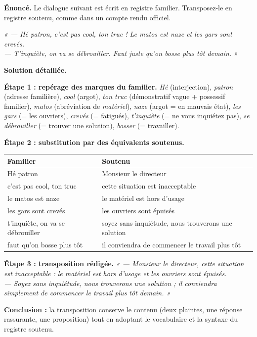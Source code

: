 \documentclass[11pt]{article}
\begin{document}
\begin{exoresolu}
\textbf{Énoncé.} Le dialogue suivant est écrit en registre familier. Transposez-le en registre soutenu, comme dans un compte rendu officiel.

\emph{« — Hé patron, c'est pas cool, ton truc ! Le matos est naze et les gars sont crevés.\\
— T'inquiète, on va se débrouiller. Faut juste qu'on bosse plus tôt demain. »}

\tcblower
\textbf{Solution détaillée.}

\textbf{Étape 1 : repérage des marques du familier.} \emph{Hé} (interjection), \emph{patron} (adresse familière), \emph{cool} (argot), \emph{ton truc} (démonstratif vague + possessif familier), \emph{matos} (abréviation de \emph{matériel}), \emph{naze} (argot = en mauvais état), \emph{les gars} (= les ouvriers), \emph{crevés} (= fatigués), \emph{t'inquiète} (= ne vous inquiétez pas), \emph{se débrouiller} (= trouver une solution), \emph{bosser} (= travailler).

\textbf{Étape 2 : substitution par des équivalents soutenus.}
\begin{center}
\begin{tabularx}{\linewidth}{|l|X|}\hline
\rowcolor{popblueL} \textbf{Familier} & \textbf{Soutenu} \\ \hline
Hé patron & Monsieur le directeur \\ \hline
c'est pas cool, ton truc & cette situation est inacceptable \\ \hline
le matos est naze & le matériel est hors d'usage \\ \hline
les gars sont crevés & les ouvriers sont épuisés \\ \hline
t'inquiète, on va se débrouiller & soyez sans inquiétude, nous trouverons une solution \\ \hline
faut qu'on bosse plus tôt & il conviendra de commencer le travail plus tôt \\ \hline
\end{tabularx}
\end{center}

\textbf{Étape 3 : transposition rédigée.} \emph{« — Monsieur le directeur, cette situation est inacceptable : le matériel est hors d'usage et les ouvriers sont épuisés.\\
— Soyez sans inquiétude, nous trouverons une solution ; il conviendra simplement de commencer le travail plus tôt demain. »}

\textbf{Conclusion :} la transposition conserve le contenu (deux plaintes, une réponse rassurante, une proposition) tout en adoptant le vocabulaire et la syntaxe du registre soutenu.
\end{exoresolu}
\end{document}
